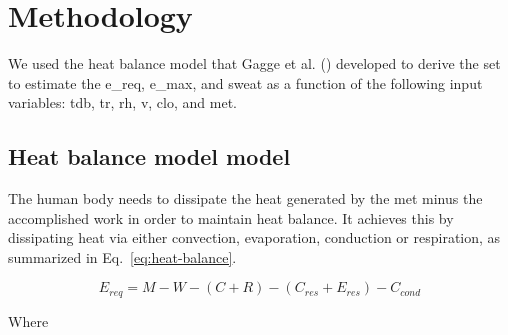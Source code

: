 
\section{Methodology}\label{sec:methodology}

We used the heat balance model that Gagge et al. (\citeyear{GaggeSET}) developed to derive the \ac{set} to estimate the \ac{e_req}, \ac{e_max}, and \ac{sweat} as a function of the following input variables: \ac{tdb}, \ac{tr}, \ac{rh}, \ac{v}, \ac{clo}, and \ac{met}.

\subsection{Heat balance model model}\label{subsec:heat-balance-model-model}

The human body needs to dissipate the heat generated by the \ac{met} minus the accomplished \ac{work} in order to maintain heat balance.
It achieves this by dissipating heat via either convection, evaporation, conduction or respiration, as summarized in Eq.~\ref{eq:heat-balance}.

\begin{equation}
    E_{req} = M - W - (C + R) - (C_{res} + E_{res}) - C_{cond}\label{eq:heat-balance}
\end{equation}

Where